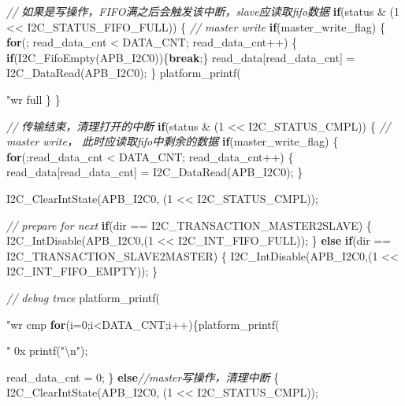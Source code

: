 \documentclass[
  12pt,
]{book}
\newenvironment{Shaded}{\begin{snugshade}}{\end{snugshade}}
\newcommand{\CommentTok}[1]{\textcolor[rgb]{0.56,0.35,0.01}{\textit{#1}}}
\newcommand{\ControlFlowTok}[1]{\textcolor[rgb]{0.13,0.29,0.53}{\textbf{#1}}}
\newcommand{\DecValTok}[1]{\textcolor[rgb]{0.00,0.00,0.81}{#1}}
\newcommand{\NormalTok}[1]{#1}
\newcommand{\SpecialCharTok}[1]{\textcolor[rgb]{0.00,0.00,0.00}{#1}}
\newcommand{\StringTok}[1]{\textcolor[rgb]{0.31,0.60,0.02}{#1}}
\begin{document}
\begin{Shaded}
\begin{Highlighting}[]
{{  \CommentTok{// 如果是写操作，FIFO满之后会触发该中断，slave应读取fifo数据}
  \ControlFlowTok{if}\NormalTok{(status & (}\DecValTok{1}\NormalTok{ << I2C_STATUS_FIFO_FULL))}
\NormalTok{  \{}
    \CommentTok{// master write}
    \ControlFlowTok{if}\NormalTok{(master_write_flag)}
\NormalTok{    \{}
      \ControlFlowTok{for}\NormalTok{(; read_data_cnt < DATA_CNT; read_data_cnt++)}
\NormalTok{      \{}
        \ControlFlowTok{if}\NormalTok{(I2C_FifoEmpty(APB_I2C0))\{}\ControlFlowTok{break}\NormalTok{;\}}
\NormalTok{        read_data[read_data_cnt] = I2C_DataRead(APB_I2C0);}
\NormalTok{      \}}
\NormalTok{      platform_printf(}\StringTok{"wr full %
\NormalTok{    \}}
\NormalTok{  \}}
  
  \CommentTok{// 传输结束，清理打开的中断}
  \ControlFlowTok{if}\NormalTok{(status & (}\DecValTok{1}\NormalTok{ << I2C_STATUS_CMPL))}
\NormalTok{  \{}
    \CommentTok{// master write， 此时应读取fifo中剩余的数据}
    \ControlFlowTok{if}\NormalTok{(master_write_flag)}
\NormalTok{    \{}
      \ControlFlowTok{for}\NormalTok{(;read_data_cnt < DATA_CNT; read_data_cnt++)}
\NormalTok{      \{}
\NormalTok{        read_data[read_data_cnt] = I2C_DataRead(APB_I2C0);}
\NormalTok{      \}}
      
\NormalTok{      I2C_ClearIntState(APB_I2C0, (}\DecValTok{1}\NormalTok{ << I2C_STATUS_CMPL));}
      
      \CommentTok{// prepare for next}
      \ControlFlowTok{if}\NormalTok{(dir == I2C_TRANSACTION_MASTER2SLAVE)}
\NormalTok{      \{}
\NormalTok{          I2C_IntDisable(APB_I2C0,(}\DecValTok{1}\NormalTok{ << I2C_INT_FIFO_FULL));}
\NormalTok{      \}}
      \ControlFlowTok{else} \ControlFlowTok{if}\NormalTok{(dir == I2C_TRANSACTION_SLAVE2MASTER)}
\NormalTok{      \{}
\NormalTok{          I2C_IntDisable(APB_I2C0,(}\DecValTok{1}\NormalTok{ << I2C_INT_FIFO_EMPTY));}
\NormalTok{      \}}
      
      \CommentTok{// debug trace}
\NormalTok{      platform_printf(}\StringTok{"wr cmp %
      \ControlFlowTok{for}\NormalTok{(i=}\DecValTok{0}\NormalTok{;i<DATA_CNT;i++)\{platform_printf(}\StringTok{" 0x%
\NormalTok{      printf(}\StringTok{"}\SpecialCharTok{\textbackslash{}n}\StringTok{"}\NormalTok{);}
      
\NormalTok{      read_data_cnt = }\DecValTok{0}\NormalTok{;}
\NormalTok{    \}}
    \ControlFlowTok{else}\CommentTok{//master写操作，清理中断}
\NormalTok{    \{}
\NormalTok{      I2C_ClearIntState(APB_I2C0, (}\DecValTok{1}\NormalTok{ << I2C_STATUS_CMPL));}
      
}}}}}
\end{Highlighting}
\end{Shaded}
\end{document}
